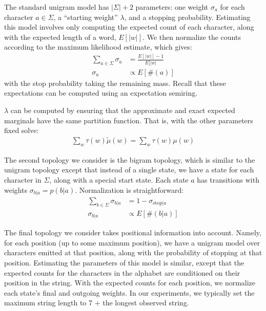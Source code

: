 \documentclass[11pt,a4paper]{article}
\begin{document}
The standard unigram model has $|\Sigma|+2$ parameters:
one weight $\sigma_a$ for each character $a \in \Sigma$, a ``starting
weight'' $\lambda$, and a stopping probability. Estimating this
model involves only computing the expected count of each character,
along with the expected length of a word, $E[|w|]$. We then normalize
the counts according to the maximum likelihood estimate, which
gives: 
\begin{equation*}
  \begin{split}
    \sum_{a\in\Sigma} \sigma_a &= \frac{E[|w|]-1}{E[|w|} \\
    \sigma_a &\propto E[\#(a)]
   \end{split}
 \end{equation*}
with the stop probability taking the remaining mass. Recall that
these expectations can be computed using an expectation semiring.

$\lambda$ can be computed by ensuring that the
approximate and exact expected marginals have the same partition
function. That is, with the other parameters fixed solve:
\begin{equation*}
  \begin{split}
    \sum_w \tau(w) \tilde\mu(w) = \sum_w \tau(w) \mu(w)
  \end{split}
\end{equation*}

The second topology we consider is the bigram topology, which is
similar to the unigram topology except that instead of a single
state, we have a state for each character in $\Sigma$, along with
a special start state. Each state $a$ has transitions with weights
$\sigma_{b|a}= p(b|a)$. Normalization is straightforward:
\begin{equation*}
  \begin{split}
    \sum_{b\in\Sigma} \sigma_{b|a}&= 1-\sigma_{\mathrm{stop}|a} \\
    \sigma_{b|a} &\propto E[\#(b|a)]
   \end{split}
 \end{equation*}

The final topology we consider takes positional information into
account. Namely, for each position (up to some maximum position),
we have a unigram model over characters emitted at that position,
along with the probability of stopping at that position. Estimating
the parameters of this model is similar, except that the expected
counts for the characters in the alphabet are conditioned on their
position in the string. With the expected counts for each position,
we normalize each state's final and outgoing weights. In our
experiments, we typically set the maximum string length to 7 + the
longest observed string.
\end{document}
